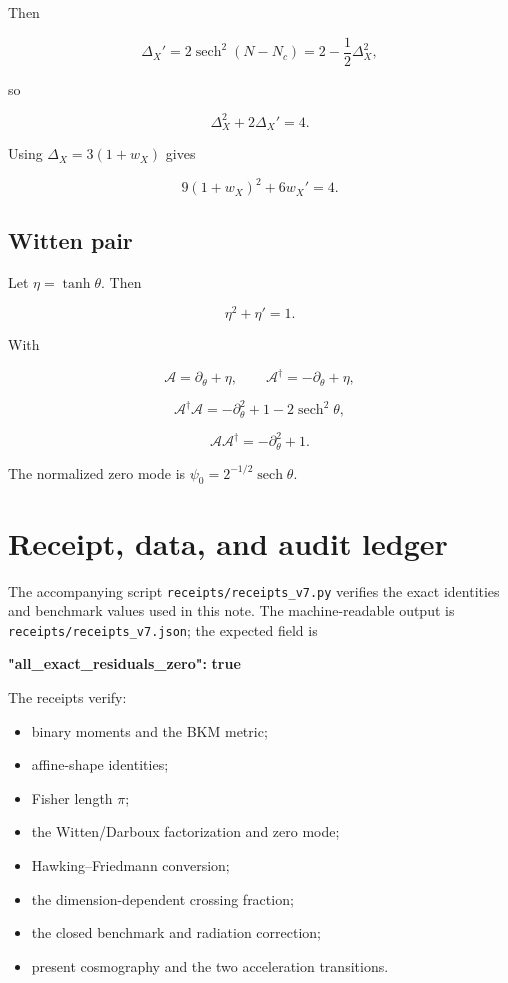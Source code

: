 \documentclass[
  11pt,
  letterpaper,
]{article}
\newenvironment{Shaded}{}{}
\newcommand{\ErrorTok}[1]{\textcolor[rgb]{1.00,0.00,0.00}{\textbf{#1}}}
\providecommand{\tightlist}{%
  \setlength{\itemsep}{0pt}\setlength{\parskip}{0pt}}
\begin{document}
Then

\[
\Delta_X'=2\operatorname{sech}^2(N-N_c)=2-\frac12\Delta_X^2,
\]

so

\[
\Delta_X^2+2\Delta_X'=4.
\]

Using \(\Delta_X=3(1+w_X)\) gives

\[
9(1+w_X)^2+6w_X'=4.
\]

\subsection{Witten pair}\label{witten-pair}

Let \(\eta=\tanh\theta\). Then

\[
\eta^2+\eta'=1.
\]

With

\[
\mathcal A=\partial_\theta+\eta,
\qquad
\mathcal A^\dagger=-\partial_\theta+\eta,
\]

\[
\mathcal A^\dagger\mathcal A=-\partial_\theta^2+1-2\operatorname{sech}^2\theta,
\]

\[
\mathcal A\mathcal A^\dagger=-\partial_\theta^2+1.
\]

The normalized zero mode is
\(\psi_0=2^{-1/2}\operatorname{sech}\theta\).

\section{Receipt, data, and audit
ledger}\label{receipt-data-and-audit-ledger}

The accompanying script \texttt{receipts/receipts\_v7.py} verifies the
exact identities and benchmark values used in this note. The
machine-readable output is \texttt{receipts/receipts\_v7.json}; the
expected field is

\begin{Shaded}
\begin{Highlighting}[]
\ErrorTok{"all\_exact\_residuals\_zero":} \ErrorTok{true}
\end{Highlighting}
\end{Shaded}

The receipts verify:

\begin{itemize}
\tightlist
\item
  binary moments and the BKM metric;
\item
  affine-shape identities;
\item
  Fisher length \(\pi\);
\item
  the Witten/Darboux factorization and zero mode;
\item
  Hawking--Friedmann conversion;
\item
  the dimension-dependent crossing fraction;
\item
  the closed benchmark and radiation correction;
\item
  present cosmography and the two acceleration transitions.
\end{itemize}
\end{document}
